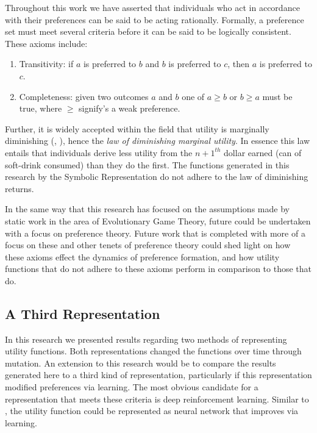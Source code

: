 \documentclass[11pt]{book}
\newcommand*{\np}{\par\noindent\newline}
\begin{document}
\np Throughout this work we have asserted that individuals who act in accordance with their preferences can be said to be acting rationally.
Formally, a preference set must meet several criteria before it can be said to be logically consistent.
These axioms include:
\begin{enumerate}[label={\alph*)}]
	\item Transitivity: if $a$ is preferred to $b$ and $b$ is preferred to $c$, then $a$ is preferred to $c$.
	\item Completeness: given two outcomes $a$ and $b$ one of $a \geq b$ or $b \geq a$ must be true, where $\geq$ signify's a weak preference.
\end{enumerate}
\citet{angner_course_2012}

\np Further, it is widely accepted within the field that utility is marginally diminishing (\citet{angner_course_2012}, \citet{lane_diminishing_2000}), hence the \textit{law of diminishing marginal utility}.
In essence this law entails that individuals derive less utility from the $n+1^{th}$ dollar earned (can of soft-drink consumed) than they do the first.
The functions generated in this research by the Symbolic Representation do not adhere to the law of diminishing returns.

\np In the same way that this research has focused on the assumptions made by static work in the area of Evolutionary Game Theory, future could be undertaken with a focus on preference theory.
Future work that is completed with more of a focus on these and other tenets of preference theory could shed light on how these axioms effect the dynamics of preference formation, 
and how utility functions that do not adhere to these axioms perform in comparison to those that do.


\subsection{A Third Representation}
In this research we presented results regarding two methods of representing utility functions.
Both representations changed the functions over time through mutation.
An extension to this research would be to compare the results generated here to a third kind of representation, particularly if this representation modified preferences via learning.
The most obvious candidate for a representation that meets these criteria is deep reinforcement learning.
Similar to \citet{peysakhovich_prosocial_2017}, the utility function could be represented as neural network that improves via learning.
\end{document}
